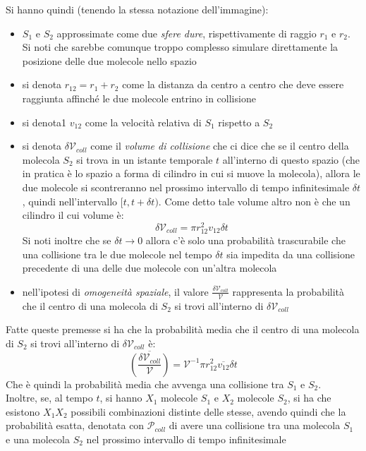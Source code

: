 \documentclass[a4paper,12pt, oneside]{book}
\begin{document}
Si hanno quindi (tenendo la stessa notazione dell'immagine):
\begin{itemize}
  \item $S_1$ e $S_2$ approssimate come due \textit{sfere dure}, rispettivamente
  di raggio $r_1$ e $r_2$. Si noti che sarebbe comunque troppo complesso
  simulare direttamente la posizione delle due molecole nello spazio
  \item si denota $r_{12}=r_1+r_2$ come la distanza da centro a centro
  che deve essere raggiunta affinché le due molecole entrino in collisione 
  \item si denota1 $v_{12}$ come la velocità relativa di $S_1$ rispetto a $S_2$
  \item si denota $\delta \mathcal{V}_{coll}$ come il \textit{volume di
    collisione} che ci dice che se il centro della molecola $S_2$ si trova in un
  istante temporale $t$ all'interno di questo spazio (che in pratica è lo spazio
  a forma di cilindro in cui si muove la molecola), allora le due molecole
  si scontreranno nel prossimo intervallo di tempo infinitesimale $\delta t$,
  quindi nell'intervallo $[t, t+\delta t)$. Come detto tale volume altro non è
  che un cilindro il cui volume è:
  \[\delta\mathcal{V}_{coll}=\pi r_{12}^2v_{12}\delta t\]
  Si noti inoltre che se $\delta t\to 0$ allora c'è solo una probabilità
  trascurabile che una collisione tra le due molecole nel tempo $\delta t$ sia
  impedita da una collisione precedente di una delle due molecole con un'altra
  molecola 
  \item nell'ipotesi di \textit{omogeneità spaziale}, il valore
  $\frac{\delta\mathcal{V}_{coll}}{\mathcal{V}}$  rappresenta la
  probabilità che il centro di una molecola di $S_2$ si trovi all'interno di
  $\delta\mathcal{V}_{coll}$  
\end{itemize}
Fatte queste premesse si ha che la probabilità media che il centro di una
molecola di $S_2$ si trovi all'interno di $\delta\mathcal{V}_{coll}$ è:
\[\overline{\left(\frac{\delta\mathcal{V}_{coll}}{\mathcal{V}}\right)}=
  \mathcal{V}^{-1}\pi r_{12}^2\overline{v_{12}}\delta t\]
Che è quindi la probabilità media che avvenga una collisione tra $S_1$ e
$S_2$. \\
Inoltre, se, al tempo $t$, si hanno $X_1$ molecole $S_1$ e $X_2$ molecole $S_2$,
si ha che esistono $X_1X_2$ possibili combinazioni distinte delle stesse, avendo
quindi che la probabilità esatta, denotata con $\mathcal{P}_{coll}$ di avere una
collisione tra una molecola $S_1$ e 
una molecola $S_2$ nel prossimo intervallo di tempo infinitesimale
\end{document}
